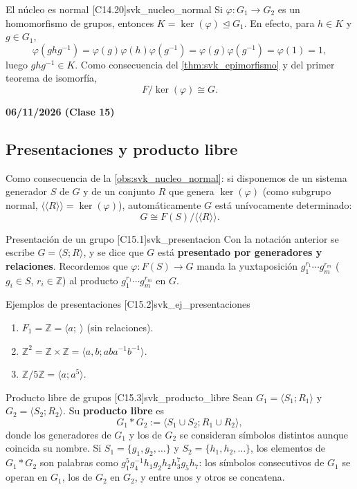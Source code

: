 \begin{observacion}{El núcleo es normal [C14.20]}{svk_nucleo_normal}
Si $\varphi \colon G_1 \to G_2$ es un homomorfismo de grupos, entonces $K = \ker(\varphi) \trianglelefteq G_1$. En efecto, para $h \in K$ y $g \in G_1$,
\[ \varphi(ghg^{-1}) = \varphi(g)\varphi(h)\varphi(g^{-1}) = \varphi(g)\varphi(g^{-1}) = \varphi(1) = 1, \]
luego $ghg^{-1} \in K$. Como consecuencia del \cref{thm:svk_epimorfismo} y del primer teorema de isomorfía,
\[ F/\ker(\varphi) \cong G. \]
\end{observacion}

\bigskip
\textbf{06/11/2026 (Clase 15)}

\subsection{Presentaciones y producto libre}

Como consecuencia de la \cref{obs:svk_nucleo_normal}: si disponemos de un sistema generador $S$ de $G$ y de un conjunto $R$ que genera $\ker(\varphi)$ (como subgrupo normal, $\langle\langle R \rangle\rangle = \ker(\varphi)$), automáticamente $G$ está unívocamente determinado:
\[ G \cong F(S) / \langle\langle R \rangle\rangle. \]

\begin{definicion}{Presentación de un grupo [C15.1]}{svk_presentacion}
Con la notación anterior se escribe $G = \langle S ; R \rangle$, y se dice que $G$ está \textbf{presentado por generadores y relaciones}. Recordemos que $\varphi \colon F(S) \to G$ manda la yuxtaposición $g_1^{r_1} \cdots g_m^{r_m}$ ($g_i \in S$, $r_i \in \mathbb{Z}$) al producto $g_1^{r_1} \cdots g_m^{r_m}$ en $G$.
\end{definicion}

\begin{observacion}{Ejemplos de presentaciones [C15.2]}{svk_ej_presentaciones}
\begin{enumerate}
    \item[1)] $F_1 = \mathbb{Z} = \langle a ; \ \rangle$ (sin relaciones).
    \item[2)] $\mathbb{Z}^2 = \mathbb{Z} \times \mathbb{Z} = \langle a, b ; aba^{-1}b^{-1} \rangle$.
    \item[3)] $\mathbb{Z}/5\mathbb{Z} = \langle a ; a^5 \rangle$.
\end{enumerate}
\end{observacion}

\begin{definicion}{Producto libre de grupos [C15.3]}{svk_producto_libre}
Sean $G_1 = \langle S_1 ; R_1 \rangle$ y $G_2 = \langle S_2 ; R_2 \rangle$. Su \textbf{producto libre} es
\[ G_1 * G_2 := \langle S_1 \cup S_2 ; R_1 \cup R_2 \rangle, \]
donde los generadores de $G_1$ y los de $G_2$ se consideran símbolos distintos aunque coincida su nombre. Si $S_1 = \{g_1, g_2, \dots\}$ y $S_2 = \{h_1, h_2, \dots\}$, los elementos de $G_1 * G_2$ son palabras como $g_1^5 g_4^{-1} h_1 g_2 h_2 h_3^7 g_5 h_7$: los símbolos consecutivos de $G_1$ se operan en $G_1$, los de $G_2$ en $G_2$, y entre unos y otros se concatena.
\end{definicion}

